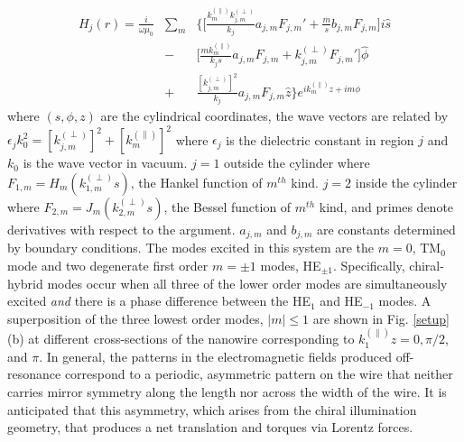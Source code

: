 \begin{eqnarray}\label{Hfield}
H_j(r) = \frac{i}{\omega\mu_0}&\sum_m &\Big\{\big[\frac{k^{(\parallel)}_{m}k_{j ,m}^{(\perp)}}{k_j}a_{j,m}F_{j,m}'+\frac{m}{s}b_{j,m}F_{j,m}\big]i\hat{s}\nonumber \\
&-&\big[\frac{mk^{(\parallel)}_{m}}{k_js}a_{j,m}F_{j,m}+{k_{j ,m}^{(\perp)}}F_{j,m}'\big]\hat{\phi}\\
&+&\frac{[k_{j ,m}^{(\perp)}]^2}{k_j}a_{j,m}F_{j,m}\hat{z}\Big\}e^{ik^{(\parallel)}_{m}z+im\phi}\nonumber
\end{eqnarray}
where $(s,\phi,z)$ are the cylindrical coordinates, the wave vectors are related by $\epsilon_jk_0^2=[k_{j ,m}^{(\perp)}]^2+[k^{(\parallel)}_m]^2$ where $\epsilon_j$ is the dielectric constant in region $j$ and $k_0$ is the wave vector in vacuum. $j=1$ outside the cylinder where $F_{1,m} = H_m (k_{1,m}^{(\perp)} s)$, the Hankel function of $m^{th}$ kind. $j=2$ inside the cylinder where $F_{2,m} = J_m(k_{2,m}^{(\perp)} s)$, the Bessel function of $m^{th}$ kind, and primes denote derivatives with respect to the argument. $a_{j,m}$ and $b_{j,m}$ are constants determined by boundary conditions. The modes excited in this system are the $m=0$, TM$_0$ mode and two degenerate first order $m=\pm 1$ modes, HE$_{\pm 1}$. Specifically, chiral-hybrid modes occur when all three of the lower order modes are simultaneously excited \textit{and} there is a phase difference between the HE$_1$ and HE$_{-1}$ modes.
A superposition of the three lowest order modes, $|m|\leq 1$ are shown in Fig. \ref{setup}(b) at different cross-sections of the nanowire corresponding to $k^{(\parallel)}_1z = 0, \pi/2$, and $\pi$. In general, the patterns in the electromagnetic fields produced off-resonance correspond to a periodic, asymmetric pattern on the wire that neither carries mirror symmetry along the length nor across the width of the wire.  It is anticipated that this asymmetry, which arises from the chiral illumination geometry, that produces a net translation and torques via Lorentz forces.

